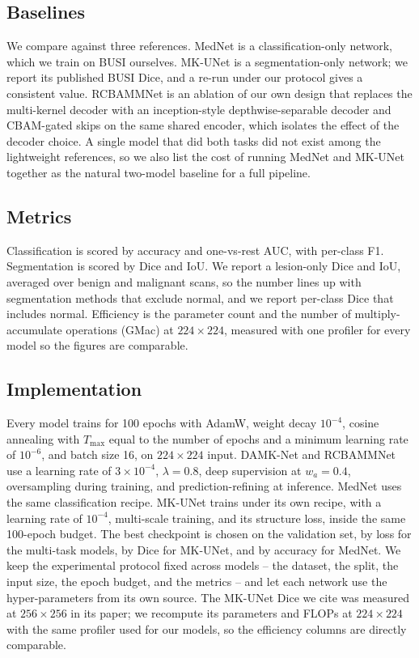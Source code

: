 \documentclass[runningheads]{llncs}
\begin{document}
\subsection{Baselines}
We compare against three references. MedNet \cite{MedNet} is a classification-only
network, which we train on BUSI ourselves. MK-UNet \cite{MKUNet} is a
segmentation-only network; we report its published BUSI Dice, and a re-run under
our protocol gives a consistent value. RCBAMMNet is an ablation of our own design
that replaces the multi-kernel decoder with an inception-style depthwise-separable
decoder and CBAM-gated skips on the same shared encoder, which isolates the effect
of the decoder choice. A single model that did both tasks did not exist among the
lightweight references, so we also list the cost of running MedNet and MK-UNet
together as the natural two-model baseline for a full pipeline.

\subsection{Metrics}
Classification is scored by accuracy and one-vs-rest AUC, with per-class F1.
Segmentation is scored by Dice and IoU. We report a lesion-only Dice and IoU,
averaged over benign and malignant scans, so the number lines up with
segmentation methods that exclude normal, and we report per-class Dice that
includes normal. Efficiency is the parameter count and the number of
multiply-accumulate operations (GMac) at $224\times224$, measured with one
profiler for every model so the figures are comparable.

\subsection{Implementation}
Every model trains for 100 epochs with AdamW, weight decay $10^{-4}$, cosine
annealing with $T_{\max}$ equal to the number of epochs and a minimum learning
rate of $10^{-6}$, and batch size 16, on $224\times224$ input. DAMK-Net and
RCBAMMNet use a learning rate of $3\times10^{-4}$, $\lambda=0.8$, deep supervision
at $w_a=0.4$, oversampling during training, and prediction-refining at inference.
MedNet uses the same classification recipe. MK-UNet trains under its own recipe,
with a learning rate of $10^{-4}$, multi-scale training, and its structure loss,
inside the same 100-epoch budget. The best checkpoint is chosen on the validation
set, by loss for the multi-task models, by Dice for MK-UNet, and by accuracy for
MedNet. We keep the experimental protocol fixed across models -- the dataset, the
split, the input size, the epoch budget, and the metrics -- and let each network
use the hyper-parameters from its own source. The MK-UNet Dice we cite was
measured at $256\times256$ in its paper; we recompute its parameters and FLOPs at
$224\times224$ with the same profiler used for our models, so the efficiency
columns are directly comparable.
\end{document}
